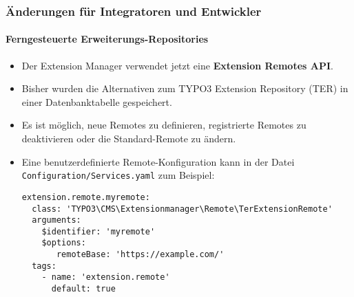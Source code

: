 %

\begin{frame}[fragile]
	\frametitle{Änderungen für Integratoren und Entwickler}
	\framesubtitle{Ferngesteuerte Erweiterungs-Repositories}


	\begin{itemize}
		\item Der Extension Manager verwendet jetzt eine \textbf{Extension Remotes API}.
		\item Bisher wurden die Alternativen zum TYPO3 Extension Repository (TER)
			in einer Datenbanktabelle gespeichert.
		\item Es ist möglich, neue Remotes zu definieren, registrierte Remotes zu deaktivieren
			oder die Standard-Remote zu ändern.
		\item Eine benutzerdefinierte Remote-Konfiguration kann in der Datei
			\small\texttt{Configuration/Services.yaml} zum Beispiel:
\begin{lstlisting}
extension.remote.myremote:
  class: 'TYPO3\CMS\Extensionmanager\Remote\TerExtensionRemote'
  arguments:
    $identifier: 'myremote'
    $options:
       remoteBase: 'https://example.com/'
  tags:
    - name: 'extension.remote'
      default: true
\end{lstlisting}

	\end{itemize}

\end{frame}

